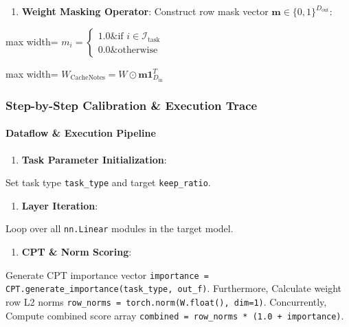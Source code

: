 \begin{enumerate}
\item \textbf{Weight Masking Operator}:
Construct row mask vector $\mathbf{m} \in \{0, 1\}^{D_{\text{out}}}$:
\end{enumerate}
\begin{center}
\begin{adjustbox}{max width=\columnwidth}
$\displaystyle
m_i = \begin{cases} 1.0 \& \text{if } i \in \mathcal{I}_{\text{task}} \\ 0.0 \& \text{otherwise} \end{cases}
$
\end{adjustbox}
\end{center}
\begin{center}
\begin{adjustbox}{max width=\columnwidth}
$\displaystyle
W_{\text{CacheNotes}} = W \odot \mathbf{m} \mathbf{1}_{D_{\text{in}}}^T
$
\end{adjustbox}
\end{center}


\subsubsection*{Step-by-Step Calibration \& Execution Trace}

\paragraph{Dataflow \& Execution Pipeline}

\begin{enumerate}
\item \textbf{Task Parameter Initialization}:
\end{enumerate}
Set task type \texttt{task\_type} and target \texttt{keep\_ratio}.

\begin{enumerate}
\item \textbf{Layer Iteration}:
\end{enumerate}
Loop over all \texttt{nn.Linear} modules in the target model.

\begin{enumerate}
\item \textbf{CPT \& Norm Scoring}:
\end{enumerate}
Generate CPT importance vector \texttt{importance = CPT.generate\_importance(task\_type, out\_f)}. Furthermore, Calculate weight row L2 norms \texttt{row\_norms = torch.norm(W.float(), dim=1)}. Concurrently, Compute combined score array \texttt{combined = row\_norms * (1.0 + importance)}.

